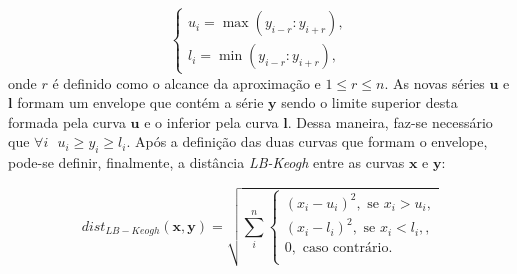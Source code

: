 \begin{equation} \label{eq:lb_keogh_ini}
\begin{cases}
u_i = \max(y_{i-r}:y_{i+r}),\\
l_i = \min(y_{i-r}:y_{i+r}),
\end{cases}
\end{equation}
onde $r$ é definido como o alcance da aproximação e $1 \leq r \leq n$. As novas séries $\bm{u}$ e $\bm{l}$ formam um envelope que contém a série $\bm{y}$ sendo o limite superior desta formada pela curva $\bm{u}$ e o inferior pela curva $\bm{l}$. Dessa maneira, faz-se necessário que $\forall i \textbf{   } u_i \geq y_i \geq l_i$. Após a definição das duas curvas que formam o envelope, pode-se definir, finalmente, a distância \emph{LB-Keogh} entre as curvas $\bm{x}$ e $\bm{y}$:

\begin{equation} \label{eq:lb_keogh_final}
dist_{LB-Keogh}(\bm{x},\bm{y}) = \sqrt{\sum_{i}^{n} 
	\begin{cases}
	(x_i-u_i)^2,\text{ se }x_i > u_i,\\
	(x_i-l_i)^2,\text{ se }x_i < l_i,,\\
	0, \text{          caso contrário}.\\
	\end{cases}
	}
\end{equation}

